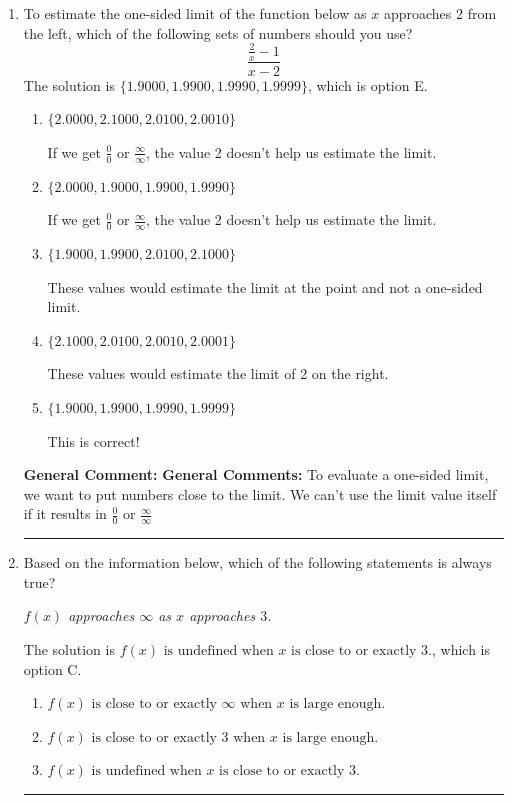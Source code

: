 \documentclass{extbook}[14pt]
\newcommand{\litem}[1]{\item #1

\rule{\textwidth}{0.4pt}}
\begin{document}
\begin{enumerate}\litem{
To estimate the one-sided limit of the function below as $x$ approaches 2 from the left, which of the following sets of numbers should you use?
\[ \frac{\frac{2}{x} - 1}{x - 2} \]The solution is \( \{ 1.9000, 1.9900, 1.9990, 1.9999 \} \), which is option E.\begin{enumerate}[label=\Alph*.]
\item \( \{ 2.0000, 2.1000, 2.0100, 2.0010 \} \)

If we get $\frac{0}{0}$ or $\frac{\infty}{\infty}$, the value 2 doesn't help us estimate the limit.
\item \( \{ 2.0000, 1.9000, 1.9900, 1.9990 \} \)

If we get $\frac{0}{0}$ or $\frac{\infty}{\infty}$, the value 2 doesn't help us estimate the limit.
\item \( \{ 1.9000, 1.9900, 2.0100, 2.1000 \} \)

These values would estimate the limit at the point and not a one-sided limit.
\item \( \{ 2.1000, 2.0100, 2.0010, 2.0001 \} \)

These values would estimate the limit of 2 on the right.
\item \( \{ 1.9000, 1.9900, 1.9990, 1.9999 \} \)

This is correct!
\end{enumerate}

\textbf{General Comment:} \textbf{General Comments:} To evaluate a one-sided limit, we want to put numbers close to the limit. We can't use the limit value itself if it results in $\frac{0}{0}$ or $\frac{\infty}{\infty}$
}
\litem{
Based on the information below, which of the following statements is always true?

\begin{center}
    \textit{ $f(x)$ approaches $\infty$ as $x$ approaches $3$. }
\end{center}
The solution is \( f(x) \text{ is undefined when } x \text{ is close to or exactly } 3. \), which is option C.\begin{enumerate}[label=\Alph*.]
\item \( f(x) \text{ is close to or exactly } \infty \text{ when } x \text{ is large enough}. \)


\item \( f(x) \text{ is close to or exactly } 3 \text{ when } x \text{ is large enough}. \)


\item \( f(x) \text{ is undefined when } x \text{ is close to or exactly } 3. \)



\end{enumerate}}
\end{enumerate}
\end{document}
